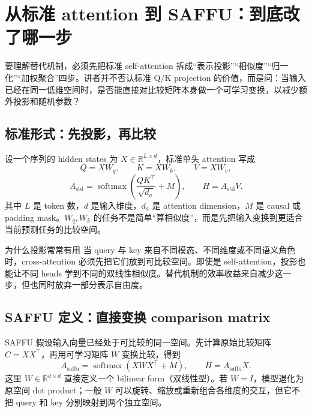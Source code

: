 \section{从标准 attention 到 SAFFU：到底改了哪一步}

要理解替代机制，必须先把标准 self-attention 拆成“表示投影”“相似度”“归一化”“加权聚合”四步。讲者并不否认标准 Q/K projection 的价值，而是问：当输入已经在同一低维空间时，是否能直接对比较矩阵本身做一个可学习变换，以减少额外投影和随机参数？

\subsection{标准形式：先投影，再比较}

设一个序列的 hidden states 为 $X\in\mathbb{R}^{L\times d}$，标准单头 attention 写成
\[
Q=XW_q,\qquad K=XW_k,\qquad V=XW_v,
\]
\[
A_{\text{std}}=\operatorname{softmax}\!\left(\frac{QK^\top}{\sqrt{d_a}}+M\right),
\qquad H=A_{\text{std}}V.
\]
其中 $L$ 是 token 数，$d$ 是输入维度，$d_a$ 是 attention dimension，$M$ 是 causal 或 padding mask。$W_q,W_k$ 的任务不是简单“算相似度”，而是先把输入变换到更适合当前预测任务的比较空间。

\begin{knowledgebox}{为什么投影常常有用}
当 query 与 key 来自不同模态、不同维度或不同语义角色时，cross-attention 必须先把它们放到可比较空间。即使是 self-attention，投影也能让不同 heads 学到不同的双线性相似度。替代机制的效率收益来自减少这一步，但也同时放弃一部分表示自由度。
\end{knowledgebox}


\subsection{SAFFU 定义：直接变换 comparison matrix}

SAFFU 假设输入向量已经处于可比较的同一空间。先计算原始比较矩阵 $C=XX^\top$，再用可学习矩阵 $W$ 变换比较，得到
\[
A_{\text{saffu}}=\operatorname{softmax}(XWX^\top+M),
\qquad H=A_{\text{saffu}}X.
\]
这里 $W\in\mathbb{R}^{d\times d}$ 直接定义一个 bilinear form（双线性型）。若 $W=I$，模型退化为原空间 dot product；一般 $W$ 可以旋转、缩放或重新组合各维度的交互，但它不把 query 和 key 分别映射到两个独立空间。


